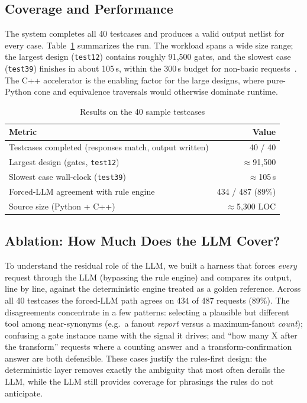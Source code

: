 \documentclass[conference]{IEEEtran}
\begin{document}
\subsection{Coverage and Performance}
The system completes all 40 testcases and produces a valid output netlist for
every case. Table~\ref{tab:results} summarizes the run. The workload spans a
wide size range; the largest design (\texttt{test12}) contains roughly
91{,}500 gates, and the slowest case (\texttt{test39}) finishes in about
105\,s, within the 300\,s budget for non-basic requests~\cite{problemA}. The
C++ accelerator is the enabling factor for the large designs, where pure-Python
cone and equivalence traversals would otherwise dominate runtime.

\begin{table}[t]
\caption{Results on the 40 sample testcases}
\label{tab:results}
\centering
\begin{tabular}{@{}lr@{}}
\toprule
\textbf{Metric} & \textbf{Value} \\
\midrule
Testcases completed (responses match, output written) & 40 / 40 \\
Largest design (gates, \texttt{test12})               & $\approx$91{,}500 \\
Slowest case wall-clock (\texttt{test39})             & $\approx$105\,s \\
Forced-LLM agreement with rule engine                 & 434 / 487 (89\%) \\
Source size (Python + C++)                            & $\approx$5{,}300 LOC \\
\bottomrule
\end{tabular}
\end{table}

\subsection{Ablation: How Much Does the LLM Cover?}
To understand the residual role of the LLM, we built a harness that forces
\emph{every} request through the LLM (bypassing the rule engine) and compares
its output, line by line, against the deterministic engine treated as a golden
reference. Across all 40 testcases the forced-LLM path agrees on 434 of 487
requests (89\%). The disagreements concentrate in a few patterns: selecting a
plausible but different tool among near-synonyms (e.g.\ a fanout \emph{report}
versus a maximum-fanout \emph{count}); confusing a gate instance name with the
signal it drives; and ``how many X after the transform'' requests where a
counting answer and a transform-confirmation answer are both defensible. These
cases justify the rules-first design: the deterministic layer removes exactly
the ambiguity that most often derails the LLM, while the LLM still provides
coverage for phrasings the rules do not anticipate.
\end{document}
